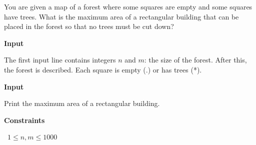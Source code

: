 You are given a map of a forest where some squares are empty and some squares have trees.
What is the maximum area of a rectangular building that can be placed in the forest so that no trees must be cut down?

\vspace{0.3cm}\noindent\textbf{Input}

The first input line contains integers $n$ and $m$: the size of the forest.
After this, the forest is described. Each square is empty (.) or has trees (*).

\vspace{0.3cm}\noindent\textbf{Input}

Print the maximum area of a rectangular building.

\vspace{0.3cm}\noindent\textbf{Constraints}

\textbullet\ $1 \le n,m \le 1000$